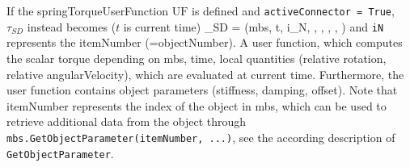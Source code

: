     If the springTorqueUserFunction $\mathrm{UF}$ is defined and \texttt{activeConnector = True}, 
	$\tau_{SD}$ instead becomes ($t$ is current time)
    \be
      \tau_{SD} = (mbs, t, i_N, \Delta\theta, \Delta\omega, , , )
    \ee
    and \texttt{iN} represents the itemNumber (=objectNumber).
    A user function, which computes the scalar torque depending on mbs, time, local quantities 
	(relative rotation, relative angularVelocity), which are evaluated at current time. 
	Furthermore, the user function contains object parameters (stiffness, damping, offset).
    Note that itemNumber represents the index of the object in mbs, which can be used to retrieve additional data from the object through
    \texttt{mbs.GetObjectParameter(itemNumber, ...)}, see the according description of \texttt{GetObjectParameter}.
    
